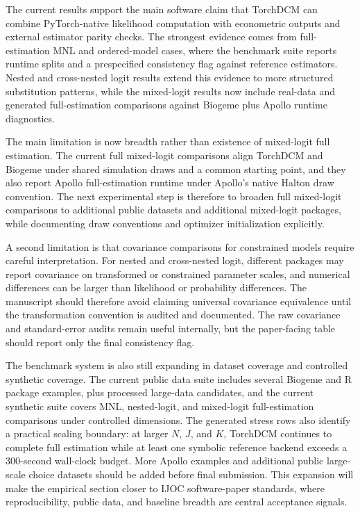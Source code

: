 The current results support the main software claim that TorchDCM can combine PyTorch-native likelihood computation with econometric outputs and external estimator parity checks.
The strongest evidence comes from full-estimation MNL and ordered-model cases, where the benchmark suite reports runtime splits and a prespecified consistency flag against reference estimators.
Nested and cross-nested logit results extend this evidence to more structured substitution patterns, while the mixed-logit results now include real-data and generated full-estimation comparisons against Biogeme plus Apollo runtime diagnostics.

The main limitation is now breadth rather than existence of mixed-logit full estimation.
The current full mixed-logit comparisons align TorchDCM and Biogeme under shared simulation draws and a common starting point, and they also report Apollo full-estimation runtime under Apollo's native Halton draw convention.
The next experimental step is therefore to broaden full mixed-logit comparisons to additional public datasets and additional mixed-logit packages, while documenting draw conventions and optimizer initialization explicitly.

A second limitation is that covariance comparisons for constrained models require careful interpretation.
For nested and cross-nested logit, different packages may report covariance on transformed or constrained parameter scales, and numerical differences can be larger than likelihood or probability differences.
The manuscript should therefore avoid claiming universal covariance equivalence until the transformation convention is audited and documented.
The raw covariance and standard-error audits remain useful internally, but the paper-facing table should report only the final consistency flag.

The benchmark system is also still expanding in dataset coverage and controlled synthetic coverage.
The current public data suite includes several Biogeme and R package examples, plus processed large-data candidates, and the current synthetic suite covers MNL, nested-logit, and mixed-logit full-estimation comparisons under controlled dimensions.
The generated stress rows also identify a practical scaling boundary: at larger $N$, $J$, and $K$, TorchDCM continues to complete full estimation while at least one symbolic reference backend exceeds a 300-second wall-clock budget.
More Apollo examples and additional public large-scale choice datasets should be added before final submission.
This expansion will make the empirical section closer to IJOC software-paper standards, where reproducibility, public data, and baseline breadth are central acceptance signals.
